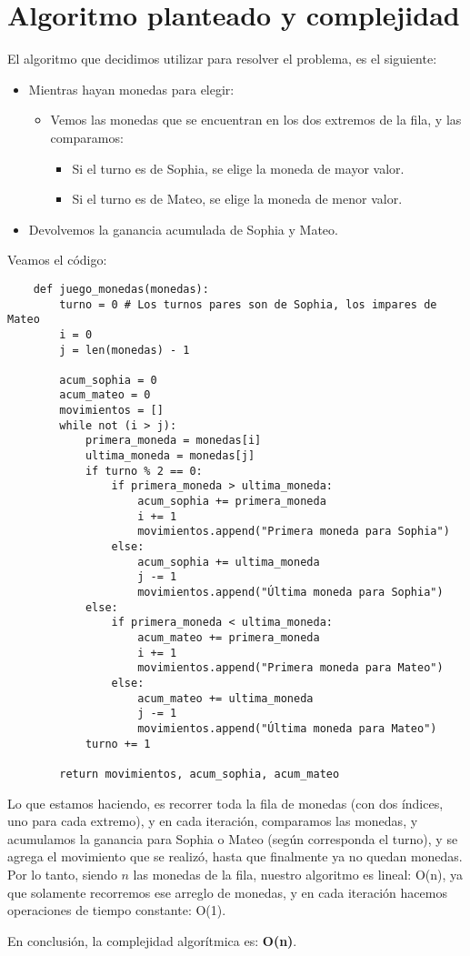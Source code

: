 \section{Algoritmo planteado y complejidad}

El algoritmo que decidimos utilizar para resolver el problema, es el siguiente:

\begin {itemize}
\item Mientras hayan monedas para elegir:
    \begin {itemize}
    \item Vemos las monedas que se encuentran en los dos extremos de la fila, y las comparamos:
        \begin {itemize}
        \item Si el turno es de Sophia, se elige la moneda de mayor valor.
        \item Si el turno es de Mateo, se elige la moneda de menor valor.
        \end {itemize}
    \end {itemize}
\item Devolvemos la ganancia acumulada de Sophia y Mateo.
\end {itemize}

Veamos el código:

\begin{verbatim}
    def juego_monedas(monedas):
        turno = 0 # Los turnos pares son de Sophia, los impares de Mateo
        i = 0
        j = len(monedas) - 1

        acum_sophia = 0
        acum_mateo = 0
        movimientos = []
        while not (i > j):
            primera_moneda = monedas[i]
            ultima_moneda = monedas[j]
            if turno % 2 == 0:
                if primera_moneda > ultima_moneda:
                    acum_sophia += primera_moneda
                    i += 1
                    movimientos.append("Primera moneda para Sophia")
                else:
                    acum_sophia += ultima_moneda
                    j -= 1
                    movimientos.append("Última moneda para Sophia")
            else:
                if primera_moneda < ultima_moneda:
                    acum_mateo += primera_moneda
                    i += 1
                    movimientos.append("Primera moneda para Mateo")
                else:
                    acum_mateo += ultima_moneda
                    j -= 1
                    movimientos.append("Última moneda para Mateo")
            turno += 1

        return movimientos, acum_sophia, acum_mateo
\end{verbatim}

Lo que estamos haciendo, es recorrer toda la fila de monedas (con dos índices, uno para cada extremo), y en cada iteración, comparamos las monedas, y acumulamos la ganancia para Sophia o Mateo (según corresponda el turno), y se agrega el movimiento que se realizó, hasta que finalmente ya no quedan monedas. Por lo tanto, siendo $n$ las monedas de la fila, nuestro algoritmo es lineal: O(n), ya que solamente recorremos ese arreglo de monedas, y en cada iteración hacemos operaciones de tiempo constante: O(1).

En conclusión, la complejidad algorítmica es: \textbf{O(n)}.